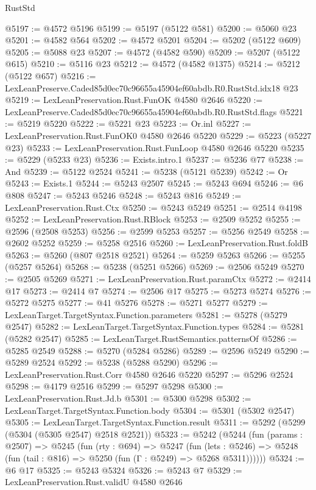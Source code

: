\begin{lexlean}{RustStd}
\begin{coremodule}
@5197 := @4572 @5196
@5199 := @5197 (@5122 @581)
@5200 := @5060 @23
@5201 := @4582 @564
@5202 := @4572 @5201
@5204 := @5202 (@5122 @609)
@5205 := @5088 @23
@5207 := @4572 (@4582 @590)
@5209 := @5207 (@5122 @615)
@5210 := @5116 @23
@5212 := @4572 (@4582 @1375)
@5214 := @5212 (@5122 @657)
@5216 := LexLeanPreserve.Caded85d0ec70c96655a45904ef60abdb.R0.RustStd.idx18 @23
@5219 := LexLeanPreservation.Rust.FunOK @4580 @2646
@5220 := LexLeanPreserve.Caded85d0ec70c96655a45904ef60abdb.R0.RustStd.flags
@5221 := @5219 @5220
@5222 := @5221 @23
@5223 := Or.inl
@5227 := LexLeanPreservation.Rust.FunOK0 @4580 @2646 @5220
@5229 := @5223 (@5227 @23)
@5233 := LexLeanPreservation.Rust.FunLoop @4580 @2646 @5220
@5235 := @5229 (@5233 @23)
@5236 := Exists.intro.{1}
@5237 := @5236 @77
@5238 := And
@5239 := @5122 @2524
@5241 := @5238 (@5121 @5239)
@5242 := Or
@5243 := Exists.{1}
@5244 := @5243 @2507
@5245 := @5243 @694
@5246 := @6 @808
@5247 := @5243 @5246
@5248 := @5243 @816
@5249 := LexLeanPreservation.Rust.Ctx
@5250 := @5243 @5249
@5251 := @2514 @4198
@5252 := LexLeanPreservation.Rust.RBlock
@5253 := @2509 @5252
@5255 := @2596 (@2508 @5253)
@5256 := @2599 @5253
@5257 := @5256 @2549
@5258 := @2602 @5252
@5259 := @5258 @2516
@5260 := LexLeanPreservation.Rust.foldB
@5263 := @5260 (@807 @2518 @2521)
@5264 := @5259 @5263
@5266 := @5255 (@5257 @5264)
@5268 := @5238 (@5251 @5266)
@5269 := @2506 @5249
@5270 := @2505 @5269
@5271 := LexLeanPreservation.Rust.paramCtx
@5272 := @2414 @17
@5273 := @2414 @7
@5274 := @2506 @17
@5275 := @5273 @5274
@5276 := @5272 @5275
@5277 := @41 @5276
@5278 := @5271 @5277
@5279 := LexLeanTarget.TargetSyntax.Function.parameters
@5281 := @5278 (@5279 @2547)
@5282 := LexLeanTarget.TargetSyntax.Function.types
@5284 := @5281 (@5282 @2547)
@5285 := LexLeanTarget.RustSemantics.patternsOf
@5286 := @5285 @2549
@5288 := @5270 (@5284 @5286)
@5289 := @2596 @5249
@5290 := @5289 @2524
@5292 := @5238 (@5288 @5290)
@5296 := LexLeanPreservation.Rust.Corr @4580 @2646 @5220
@5297 := @5296 @2524
@5298 := @4179 @2516
@5299 := @5297 @5298
@5300 := LexLeanPreservation.Rust.Jd.b
@5301 := @5300 @5298
@5302 := LexLeanTarget.TargetSyntax.Function.body
@5304 := @5301 (@5302 @2547)
@5305 := LexLeanTarget.TargetSyntax.Function.result
@5311 := @5292 (@5299 (@5304 (@5305 @2547) @2518 @2521))
@5323 := @5242
    (@5244
      (fun (params : @2507) =>
      @5245
        (fun (rty : @694) =>
        @5247
          (fun (lets : @5246) =>
          @5248 (fun (tail : @816) => @5250 (fun (Γ : @5249) => @5268 @5311))))))
@5324 := @6 @17
@5325 := @5243 @5324
@5326 := @5243 @7
@5329 := LexLeanPreservation.Rust.validU @4580 @2646

\end{coremodule}
\end{lexlean}
